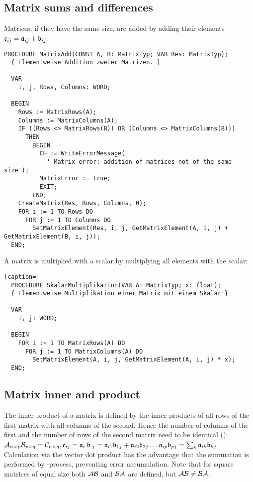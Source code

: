 \begin{refsection}
\subsection{Matrix sums and differences}

Matrices, if they have the same size, are added by adding their elements \(\mathfrak{c}_{ij} = \mathfrak{a}_{ij} + \mathfrak{b}_{ij} \):

\begin{lstlisting}[caption=Sum of two matrices]
  PROCEDURE MatrixAdd(CONST A, B: MatrixTyp; VAR Res: MatrixTyp);
  { Elementweise Addition zweier Matrizen. }

  VAR
    i, j, Rows, Columns: WORD;

  BEGIN
    Rows := MatrixRows(A);
    Columns := MatrixColumns(A);
    IF ((Rows <> MatrixRows(B)) OR (Columns <> MatrixColumns(B)))
      THEN
        BEGIN
          CH := WriteErrorMessage(
            ' Matrix error: addition of matrices not of the same size');
          MatrixError := true;
          EXIT;
        END;
    CreateMatrix(Res, Rows, Columns, 0);
    FOR i := 1 TO Rows DO
      FOR j := 1 TO Columns DO
        SetMatrixElement(Res, i, j, GetMatrixElement(A, i, j) + GetMatrixElement(B, i, j));
  END;
\end{lstlisting}

A matrix is multiplied with a scalar by multiplying all elements with the scalar:

\begin{lstlisting}[caption=]
  PROCEDURE SkalarMultiplikation(VAR A: MatrixTyp; x: float);
  { Elementweise Multiplikation einer Matrix mit einem Skalar }

  VAR
    i, j: WORD;

  BEGIN
    FOR i := 1 TO MatrixRows(A) DO
      FOR j := 1 TO MatrixColumns(A) DO
        SetMatrixElement(A, i, j, GetMatrixElement(A, i, j) * x);
  END;
\end{lstlisting}

\subsection{Matrix inner and  product}

The inner product of a matrix is defined by the inner products of all rows of the first matrix with all columns of the second. Hence the number of columns of the first and the number of rows of the second matrix need to be identical (): \(\mathcal{A}_{n\times p} \mathcal{B}_{p\times q} = \mathcal{C}_{n\times q}, \mathfrak{c}_{ij} = \mathfrak{a}_{i\cdot} \mathfrak{b}_{\cdot j} = \mathfrak{a}_{i1}\mathfrak{b}_{1j} + \mathfrak{a}_{i2}\mathfrak{b}_{2j}\ldots \mathfrak{a}_{ip}\mathfrak{b}_{pj} = \sum_{k}{\mathfrak{a}_{ik} \mathfrak{b}_{kj}} \). Calculation via the vector dot product has the advantage that the summation is performed by -process, preventing error accumulation. Note that for square matrices of equal size both \(\mathcal{AB} \) and \(\mathcal{BA} \) are defined, but \(\mathcal{AB} \neq \mathcal{BA} \).



\end{refsection}
